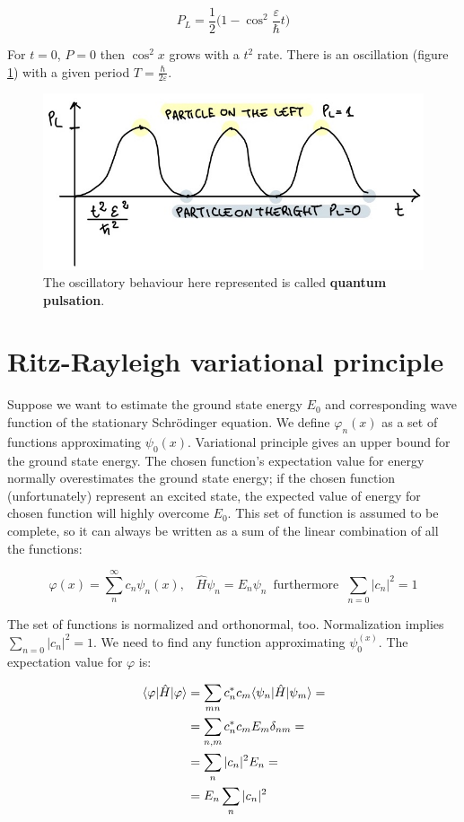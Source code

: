 $$P_L=\frac{1}{2}\bigg(1-\cos^2\frac{\varepsilon}{\hbar}t\bigg)$$

For $t=0$, $P=0$ then $\cos^2x$ grows with a $t^2$ rate.
There is an oscillation (figure \ref{fig:pulsation}) with a given period $T=\frac{\hbar}{2\varepsilon}$.

\begin{figure}[htbp!]
	\centering
	\includegraphics[scale=0.30]{img_3}
	\caption{The oscillatory behaviour here represented is called \textbf{quantum pulsation}.}
	\label{fig:pulsation}
\end{figure}

\section{Ritz-Rayleigh variational principle}
Suppose we want to estimate the ground state energy $E_0$ and corresponding wave function of the stationary Schr\"{o}dinger equation.
We define $\varphi_n(x)$ as a set of functions approximating $\psi_0(x)$.
Variational principle gives an upper bound for the ground state energy.
The chosen function's expectation value for energy normally overestimates the ground state energy; if the chosen function (unfortunately) represent an excited state, the expected value of energy for chosen function will highly overcome $E_0$.
This set of function is assumed to be complete, so it can always be written as a sum of the linear combination of all the functions:

$$\varphi(x)=\sum_{n}^{\infty}c_n\psi_n(x),\;\;\; \hat{H}\psi_n=E_n\psi_n\, \text{ furthermore} \;\; \sum_{n=0}|c_n|^2=1$$

The set of functions is normalized and orthonormal, too.
Normalization implies $\sum_{n=0}|c_n|^2=1$.
We need to find any function approximating $\psi_0^{(x)}$.
The expectation value for $\varphi$ is:

\begin{align*}
\mel{\varphi}{\hat{H}}{\varphi}&= \sum_{mn} c^*_nc_m \langle \psi_n | \hat{H} | \psi_m \rangle =\\
&=\sum_{n,m}c_n^{*}c_mE_m\delta_{nm}=\\
&=\sum_{n}|c_n|^2E_n=\\
&=E_n\sum_n |c_n|^2
\end{align*}

